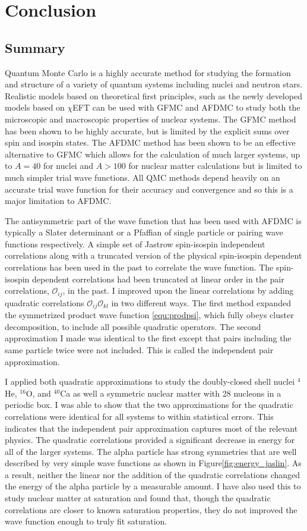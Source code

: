 \chapter{Conclusion}
\section{Summary}
Quantum Monte Carlo is a highly accurate method for studying the formation and structure of a variety of quantum systems including nuclei and neutron stars. Realistic models based on theoretical first principles, such as the newly developed models based on $\chi$EFT can be used with GFMC and AFDMC to study both the microscopic and macroscopic properties of nuclear systems. The GFMC method has been shown to be highly accurate, but is limited by the explicit sums over spin and isospin states. The AFDMC method has been shown to be an effective alternative to GFMC which allows for the calculation of much larger systems, up to $A=40$ for nuclei and $A>100$ for nuclear matter calculations but is limited to much simpler trial wave functions. All QMC methods depend heavily on an accurate trial wave function for their accuracy and convergence and so this is a major limitation to AFDMC.

The antisymmetric part of the wave function that has been used with AFDMC is typically a Slater determinant or a Pfaffian of single particle or pairing wave functions respectively. A simple set of Jastrow spin-isospin independent correlations along with a truncated version of the physical spin-isospin dependent correlations has been used in the past to correlate the wave function. The spin-isospin dependent correlations had been truncated at linear order in the pair correlations, $\mathcal{O}_{ij}$, in the past. I improved upon the linear correlations by adding quadratic correlations $\mathcal{O}_{ij}\mathcal{O}_{kl}$ in two different ways. The first method expanded the symmetrized product wave function \ref{equ:prodpsi}, which fully obeys cluster decomposition, to include all possible quadratic operators. The second approximation I made was identical to the first except that pairs including the same particle twice were not included. This is called the independent pair approximation.

I applied both quadratic approximations to study the doubly-closed shell nuclei $^4$He, $^{16}$O, and $^{40}$Ca as well a symmetric nuclear matter with 28 nucleons in a periodic box. I was able to show that the two approximations for the quadratic correlations were identical for all systems to within statistical errors. This indicates that the independent pair approximation captures most of the relevant physics. The quadratic correlations provided a significant decrease in energy for all of the larger systems. The alpha particle has strong symmetries that are well described by very simple wave functions as shown in Figure\ref{fig:energy_jaslin}. As a result, neither the linear nor the addition of the quadratic correlations changed the energy of the alpha particle by a measurable amount. I have also used this to study nuclear matter at saturation and found that, though the quadratic correlations are closer to known saturation properties, they do not improved the wave function enough to truly fit saturation.

